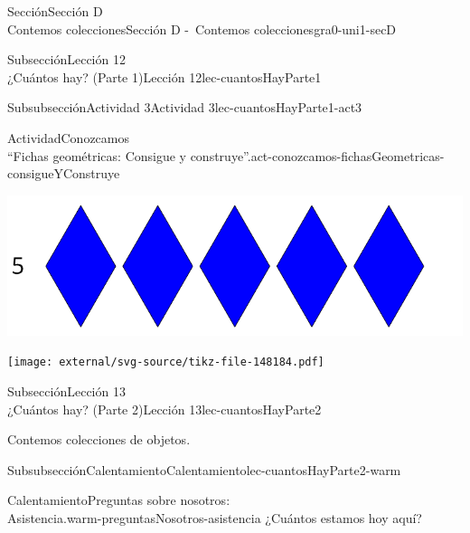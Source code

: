 \begin{sectionptx}{Sección}{{\Large Sección D\\}Contemos colecciones}{}{Sección D -~Contemos colecciones}{}{}{gra0-uni1-secD}
\begin{subsectionptx}{Subsección}{{\normalsize Lección 12\\[-0.05cm]}¿Cuántos hay? (Parte 1)}{}{Lección 12}{}{}{lec-cuantosHayParte1}
\typeout{************************************************}
%
\clearpage
\begin{subsubsectionptx}{Subsubsección}{Actividad 3}{}{Actividad 3}{}{}{lec-cuantosHayParte1-act3}
\begin{activity}{Actividad}{Conozcamos\\“Fichas geométricas: Consigue y construye”.}{act-conozcamos-fichasGeometricas-consigueYConstruye}%
\begin{image}{0}{1}{0}{}%
\includegraphics[max width=\linewidth, center]{external/svg-source/tikz-file-148183.pdf}
\end{image}%
\begin{image}{0}{1}{0}{}%
\texttt{[image: external/svg-source/tikz-file-148184.pdf]}
\end{image}%
\end{activity}%
\end{subsubsectionptx}
\end{subsectionptx}
%
%
\typeout{************************************************}
\typeout{************************************************}
%
\begin{subsectionptx}{Subsección}{{\normalsize Lección 13\\[-0.05cm]}¿Cuántos hay? (Parte 2)}{}{Lección 13}{}{}{lec-cuantosHayParte2}
\begin{introduction}{}%
Contemos colecciones de objetos.%
\end{introduction}%
%
%
\typeout{************************************************}
\typeout{************************************************}
%
\begin{subsubsectionptx}{Subsubsección}{Calentamiento}{}{Calentamiento}{}{}{lec-cuantosHayParte2-warm}
\begin{exploration}{Calentamiento}{Preguntas sobre nosotros:\\Asistencia.}{warm-preguntasNosotros-asistencia}%
¿Cuántos estamos hoy aquí?%
\end{exploration}%
\end{subsubsectionptx}

\end{subsectionptx}
\end{sectionptx}
